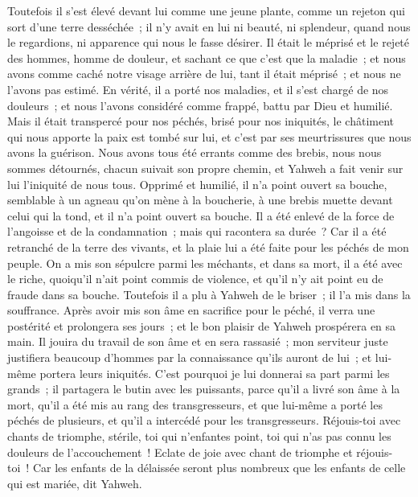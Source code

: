\begin{multicols}{2}
Toutefois il s'est élevé devant lui comme une jeune plante, comme un rejeton qui sort d'une terre desséchée~; il n'y avait en lui ni beauté, ni splendeur, quand nous le regardions, ni apparence qui nous le fasse désirer.
Il était le méprisé et le rejeté des hommes, homme de douleur, et sachant ce que c'est que la maladie~; et nous avons comme caché notre visage arrière de lui, tant il était méprisé~; et nous ne l'avons pas estimé.
En vérité, il a porté nos maladies, et il s'est chargé de nos douleurs~; et nous l'avons considéré comme frappé, battu par Dieu et humilié.
Mais il était transpercé pour nos péchés, brisé pour nos iniquités, le châtiment qui nous apporte la paix est tombé sur lui, et c'est par ses meurtrissures que nous avons la guérison.
Nous avons tous été errants comme des brebis, nous nous sommes détournés, chacun suivait son propre chemin, et Yahweh a fait venir sur lui l'iniquité de nous tous.
Opprimé et humilié, il n'a point ouvert sa bouche, semblable à un agneau qu'on mène à la boucherie, à une brebis muette devant celui qui la tond, et il n'a point ouvert sa bouche.
Il a été enlevé de la force de l'angoisse et de la condamnation~; mais qui racontera sa durée~? Car il a été retranché de la terre des vivants, et la plaie lui a été faite pour les péchés de mon peuple.
On a mis son sépulcre parmi les méchants, et dans sa mort, il a été avec le riche, quoiqu'il n'ait point commis de violence, et qu'il n'y ait point eu de fraude dans sa bouche.
Toutefois il a plu à Yahweh de le briser~; il l'a mis dans la souffrance. Après avoir mis son âme en sacrifice pour le péché, il verra une postérité et prolongera ses jours~; et le bon plaisir de Yahweh prospérera en sa main.
Il jouira du travail de son âme et en sera rassasié~; mon serviteur juste justifiera beaucoup d'hommes par la connaissance qu'ils auront de lui~; et lui-même portera leurs iniquités.
C'est pourquoi je lui donnerai sa part parmi les grands~; il partagera le butin avec les puissants, parce qu'il a livré son âme à la mort, qu'il a été mis au rang des transgresseurs, et que lui-même a porté les péchés de plusieurs, et qu'il a intercédé pour les transgresseurs.
\VerseOne{}Réjouis-toi avec chants de triomphe, stérile, toi qui n'enfantes point, toi qui n'as pas connu les douleurs de l'accouchement~! Eclate de joie avec chant de triomphe et réjouis-toi~! Car les enfants de la délaissée seront plus nombreux que les enfants de celle qui est mariée, dit Yahweh.

\end{multicols}
